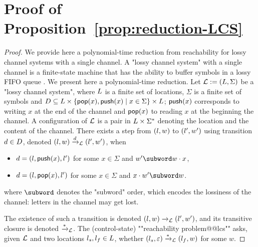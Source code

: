 \section{Proof of Proposition~\ref{prop:reduction-LCS}}
\label{app:reduction-lcs}

\propReductionLCS*
\begin{proof}
	We provide here a polynomial-time reduction from reachability for lossy channel systems with a single channel. A "lossy channel system" with a single channel is a finite-state machine that has the ability to buffer symbols in a lossy FIFO queue \cite{Schnoebelen2002verifying}. We present here a polynomial-time reduction.
	Let $\mathcal{L} := (L,\Sigma)$ be a "lossy channel system", where $L$ is a finite set of locations, $\Sigma$ is a finite set of symbols and $D \subseteq L \times \{\mathsf{pop}(x), \mathsf{push}(x) \mid x \in \Sigma\} \times L$; $\mathsf{push}(x)$ corresponds to writing $x$ at the end of the channel and $\mathsf{pop}(x)$ to reading $x$ at the beginning the channel. A configuration of $\mathcal{L}$ is a pair in $L \times \Sigma^*$ denoting the location and the content of the channel. There exists a step from $(l,w)$ to $(l',w')$ using transition $d \in D$, denoted $(l,w) \xrightarrow{d}_{\mathcal{L}} (l',w')$, when
	\begin{itemize}
		\item $d = (l,\mathsf{push}(x),l')$ for some $x \in \Sigma$ and $w' \subword w \cdot x$,
		\item $d = (l,\mathsf{pop}(x),l')$ for some $x \in \Sigma$ and $x \cdot w' \subword w$.
	\end{itemize}
	where $\subword$ denotes the "subword" order, which encodes the lossiness of the channel: letters in the channel may get lost. 
	
	The existence of such a transition is denoted $(l,w) \xrightarrow{}_{\mathcal{L}} (l',w')$, and its transitive closure is denoted $\xrightarrow{*}_{\mathcal{L}}$. The (control-state) ""reachability problem@@lcs"" asks, given $\mathcal{L}$ and two locations $l_s, l_f \in L$, whether $(l_s,\varepsilon) \xrightarrow{*}_{\mathcal{L}} (l_f, w)$ for some $w$. 
	


\end{proof}
